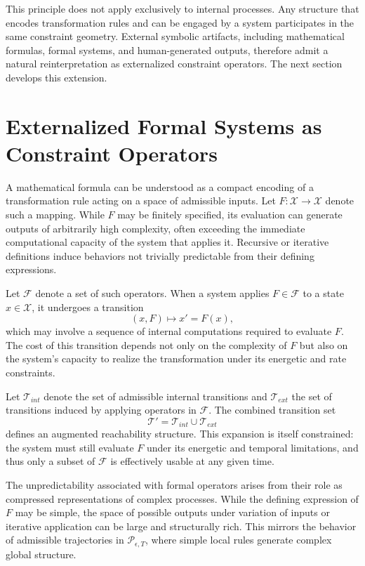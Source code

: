 \documentclass[12pt]{article}
\theoremstyle{plain}
\theoremstyle{definition}
\theoremstyle{remark}
\begin{document}
This principle does not apply exclusively to internal processes. Any structure that encodes transformation rules and can be engaged by a system participates in the same constraint geometry. External symbolic artifacts, including mathematical formulas, formal systems, and human-generated outputs, therefore admit a natural reinterpretation as externalized constraint operators. The next section develops this extension.

\section{Externalized Formal Systems as Constraint Operators}

A mathematical formula can be understood as a compact encoding of a transformation rule acting on a space of admissible inputs. Let $F : \mathcal{X} \to \mathcal{X}$ denote such a mapping. While $F$ may be finitely specified, its evaluation can generate outputs of arbitrarily high complexity, often exceeding the immediate computational capacity of the system that applies it. Recursive or iterative definitions induce behaviors not trivially predictable from their defining expressions.

Let $\mathcal{F}$ denote a set of such operators. When a system applies $F \in \mathcal{F}$ to a state $x \in \mathcal{X}$, it undergoes a transition
\[
(x, F) \mapsto x' = F(x),
\]
which may involve a sequence of internal computations required to evaluate $F$. The cost of this transition depends not only on the complexity of $F$ but also on the system's capacity to realize the transformation under its energetic and rate constraints.

Let $\mathcal{T}_{int}$ denote the set of admissible internal transitions and $\mathcal{T}_{ext}$ the set of transitions induced by applying operators in $\mathcal{F}$. The combined transition set
\[
\mathcal{T}' = \mathcal{T}_{int} \cup \mathcal{T}_{ext}
\]
defines an augmented reachability structure. This expansion is itself constrained: the system must still evaluate $F$ under its energetic and temporal limitations, and thus only a subset of $\mathcal{F}$ is effectively usable at any given time.

The unpredictability associated with formal operators arises from their role as compressed representations of complex processes. While the defining expression of $F$ may be simple, the space of possible outputs under variation of inputs or iterative application can be large and structurally rich. This mirrors the behavior of admissible trajectories in $\mathcal{P}_{\epsilon,T}$, where simple local rules generate complex global structure.
\end{document}
